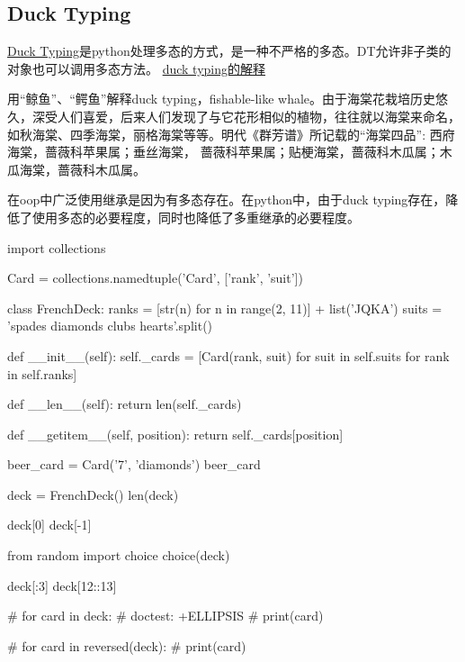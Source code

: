 \subsection{Duck Typing}
\href{http://en.wikipedia.org/wiki/Duck_typing}{Duck Typing}是python处理多态的方式，是一种不严格的多态。DT允许非子类的对象也可以调用多态方法。
\href{http://www.voidspace.org.uk/python/articles/duck_typing.shtlm}{duck typing的解释}





用“鲸鱼”、“鳄鱼”解释duck typing，fishable-like whale。由于海棠花栽培历史悠久，深受人们喜爱，后来人们发现了与它花形相似的植物，往往就以海棠来命名，如秋海棠、四季海棠，丽格海棠等等。明代《群芳谱》所记载的“海棠四品”: 西府海棠，蔷薇科苹果属；垂丝海棠，
蔷薇科苹果属；贴梗海棠，蔷薇科木瓜属；木瓜海棠，蔷薇科木瓜属。

在oop中广泛使用继承是因为有多态存在。在python中，由于duck typing存在，降低了使用多态的必要程度，同时也降低了多重继承的必要程度。

\begin{python}
import collections

Card = collections.namedtuple('Card', ['rank', 'suit'])

class FrenchDeck:
    ranks = [str(n) for n in range(2, 11)] + list('JQKA')
    suits = 'spades diamonds clubs hearts'.split()

    def __init__(self):
        self._cards = [Card(rank, suit) for suit in self.suits
                                        for rank in self.ranks]

    def __len__(self):
        return len(self._cards)

    def __getitem__(self, position):
        return self._cards[position]

beer_card = Card('7', 'diamonds')
beer_card

deck = FrenchDeck()
len(deck)

deck[0]
deck[-1]

from random import choice 
choice(deck)

deck[:3]
deck[12::13]

# for card in deck:  #  doctest: +ELLIPSIS
#     print(card)

# for card in reversed(deck):
#     print(card)
\end{python}


